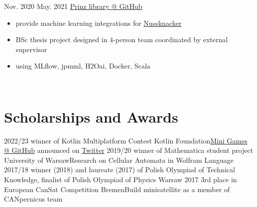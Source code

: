 \documentclass[a4paper]{twentysecondcv} %
\begin{document}
\begin{twenty}
        \twentyitem
        {Nov. 2020}
        {May. 2021}
        {\href{https://github.com/prinz-nussknacker/prinz}{Prinz library {\footnotesize @ GitHub}}}
        {}
        {}
        {\begin{itemize}
             \item provide machine learning integrations for \href{https://github.com/TouK/nussknacker}{Nussknacker}
             \item BSc thesis project designed in 4-person team coordinated by external supervisor
             \item using MLflow, jpmml, H2Oai, Docker, Scala
        \end{itemize}}
        \\
    \end{twenty}

    \vspace{-0.6cm}

    \section{Scholarships and Awards}
    \begin{twenty}
        \twentyitem
        {2022/23}
        {}
        {winner of Kotlin Multiplatform Contest}
        {Kotlin Foundation}{\href{https://github.com/avan1235/mini-games}{Mini Games {\footnotesize @ GitHub}} announced on \href{https://twitter.com/kotlinconf/status/1616430150836445184}{Twitter}}{}
        \twentyitem
        {2019/20}
        {}
        {winner of Mathematica student project}
        {University of Warsaw}{Research on Cellular Automata in Wolfram Language}{}
        \twentyitem
        {2017/18}
        {}
        {winner (2018) and laureate (2017) of Polish Olympiad of Technical Knowledge, finalist of Polish Olympiad of Physics}
        {Warsaw}{}{}
        \twentyitem
        {2017}
        {}
        {3rd place in European CanSat Competition}
        {Bremen}{Build minisatellite as a member of CANpernicus team}{}
    \end{twenty}


%
\end{document}
